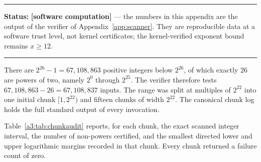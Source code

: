 \documentclass[11pt,oneside]{article}
\theoremstyle{definition}
\theoremstyle{remark}
\newcommand{\statuscomp}{\textcolor{computeviolet}{\textbf{[software computation]}}}
\newenvironment{statusbox}[1]
{\begin{center}\begin{minipage}{0.94\textwidth}\raggedright\hbadness=10000\hrule
\vspace{0.45em}\textbf{Status:} #1\par\vspace{0.35em}}
{\vspace{0.35em}\hrule\end{minipage}\end{center}}
\begin{document}
\begin{statusbox}{\statuscomp{} --- the numbers in this appendix are the output of the
verifier of Appendix~\ref{app:scanner}.  They are reproducible data at a software trust
level, not kernel certificates; the kernel-verified exponent bound remains $x\ge12$.}
\end{statusbox}

There are $2^{26}-1=67{,}108{,}863$ positive integers below $2^{26}$, of which exactly $26$
are powers of two, namely $2^{0}$ through $2^{25}$.  The verifier therefore tests
$67{,}108{,}863-26=67{,}108{,}837$ inputs.  The range was split at multiples of $2^{22}$ into
one initial chunk $[1,2^{22})$ and fifteen chunks of width $2^{22}$.  The canonical chunk log
holds the full standard output of every invocation.

Table~\ref{a3:tab:chunkaudit} reports, for each chunk, the exact scanned integer interval, the
number of non-powers certified, and the smallest directed lower and upper logarithmic margins
recorded in that chunk.  Every chunk returned a failure count of zero.
\end{document}
